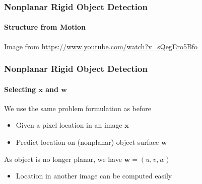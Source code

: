 \documentclass[xetex,professionalfont]{beamer}
\renewcommand{\vec}[1]{\ensuremath{\mathbf{#1}}}
\newcommand{\vw}{\vec{w}}
\newcommand{\vx}{\vec{x}}
\begin{document}

\begin{frame}
\frametitle{Nonplanar Rigid Object Detection}
\framesubtitle{Structure from Motion}

\begin{center}
    {\centering Image from \url{https://www.youtube.com/watch?v=sQegEro5Bfo}}
\end{center}

\end{frame}


\begin{frame}
\frametitle{Nonplanar Rigid Object Detection}
\framesubtitle{Selecting $\vx$ and $\vw$}

We use the same problem formulation as before
\begin{itemize}
    \item Given a pixel location in an image $\vx$
    \item Predict location on (nonplanar) object surface $\vw$
\end{itemize}

\bigskip
As object is no longer planar, we have $\vw=(u,v,w)$
\begin{itemize}
    \item Location in another image can be computed easily %
\end{itemize}

\end{frame}

\end{document}
